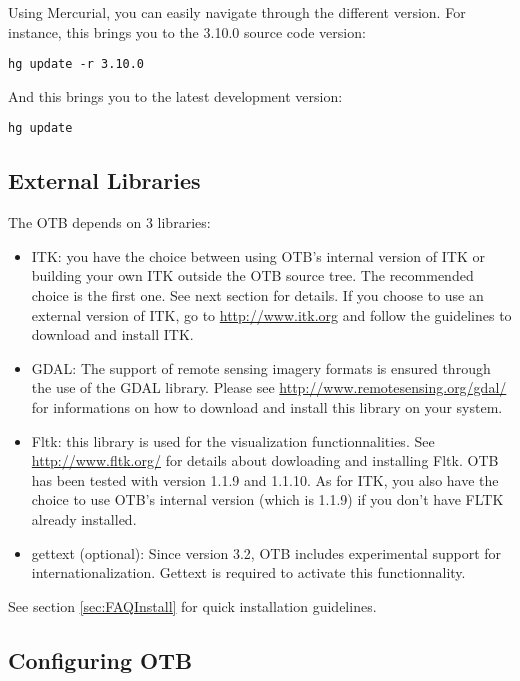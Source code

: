 Using Mercurial, you can easily navigate through the different version. For instance, this brings you to the 3.10.0 source code version:
\begin{verbatim}
hg update -r 3.10.0
\end{verbatim}

And this brings you to the latest development version:
\begin{verbatim}
hg update
\end{verbatim}


\subsection{External Libraries}

The OTB depends on 3 libraries:
\begin{itemize}
  \item ITK: you have the choice between using OTB's internal version
  of ITK or building your own ITK outside the OTB source tree. The
  recommended choice is the first one. See next section for
  details. If you choose to use an external version of ITK, go to
  \url{http://www.itk.org} and follow the guidelines to download and
  install ITK.
  \item GDAL: The support of remote sensing imagery formats is ensured
    through the use of the GDAL library. Please see
\url{http://www.remotesensing.org/gdal/} for informations on how to
download and install this library on your system.
\item Fltk: this library is used for the visualization
  functionnalities. See \url{http://www.fltk.org/} for details about
  dowloading and installing Fltk. OTB has been tested with version 1.1.9
  and 1.1.10. As for ITK, you also have the choice to use OTB's internal
  version (which is 1.1.9) if you don't have FLTK already installed.
\item gettext (optional): Since version 3.2, OTB includes experimental support 
  for internationalization. Gettext is required to activate this 
  functionnality.  
\end{itemize}

See section \ref{sec:FAQInstall} for quick installation guidelines.

\subsection{Configuring OTB}
\label{sec:ConfiguringOTB}


